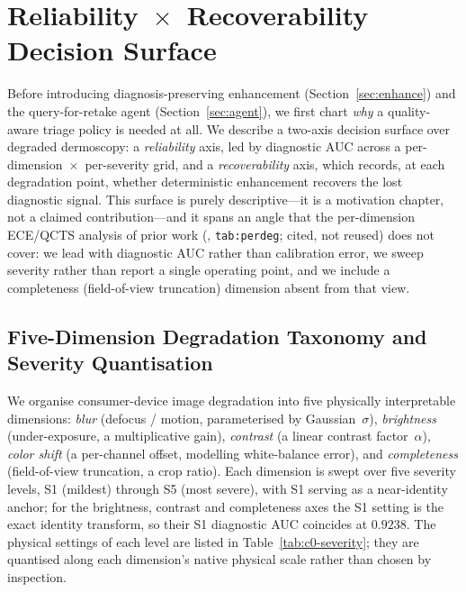 
\section{Reliability~$\times$~Recoverability Decision Surface}
\label{sec:decision-surface}

Before introducing diagnosis-preserving enhancement (Section~\ref{sec:enhance}) and the query-for-retake agent (Section~\ref{sec:agent}), we first chart \emph{why} a quality-aware triage policy is needed at all. We describe a two-axis decision surface over degraded dermoscopy: a \emph{reliability} axis, led by diagnostic AUC across a per-dimension~$\times$~per-severity grid, and a \emph{recoverability} axis, which records, at each degradation point, whether deterministic enhancement recovers the lost diagnostic signal. This surface is purely descriptive---it is a motivation chapter, not a claimed contribution---and it spans an angle that the per-dimension ECE/QCTS analysis of prior work (\citep{ANON-BMVC}, \texttt{tab:perdeg}; cited, not reused) does not cover: we lead with diagnostic AUC rather than calibration error, we sweep severity rather than report a single operating point, and we include a completeness (field-of-view truncation) dimension absent from that view.

\subsection{Five-Dimension Degradation Taxonomy and Severity Quantisation}
\label{sec:degradation-taxonomy}

We organise consumer-device image degradation into five physically interpretable dimensions: \emph{blur} (defocus / motion, parameterised by Gaussian~$\sigma$), \emph{brightness} (under-exposure, a multiplicative gain), \emph{contrast} (a linear contrast factor~$\alpha$), \emph{color shift} (a per-channel offset, modelling white-balance error), and \emph{completeness} (field-of-view truncation, a crop ratio). Each dimension is swept over five severity levels, S1 (mildest) through S5 (most severe), with S1 serving as a near-identity anchor; for the brightness, contrast and completeness axes the S1 setting is the exact identity transform, so their S1 diagnostic AUC coincides at $0.9238$. The physical settings of each level are listed in Table~\ref{tab:c0-severity}; they are quantised along each dimension's native physical scale rather than chosen by inspection.

